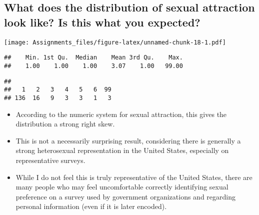 \documentclass[
]{article}
\newenvironment{Shaded}{\begin{snugshade}}{\end{snugshade}}
\newcommand{\FunctionTok}[1]{\textcolor[rgb]{0.00,0.00,0.00}{#1}}
\newcommand{\NormalTok}[1]{#1}
\newcommand{\SpecialCharTok}[1]{\textcolor[rgb]{0.00,0.00,0.00}{#1}}
\providecommand{\tightlist}{%
  \setlength{\itemsep}{0pt}\setlength{\parskip}{0pt}}
\begin{document}
\hypertarget{what-does-the-distribution-of-sexual-attraction-look-like-is-this-what-you-expected}{%
\subsection{What does the distribution of sexual attraction look like?
Is this what you
expected?}\label{what-does-the-distribution-of-sexual-attraction-look-like-is-this-what-you-expected}}

\begin{Shaded}
\end{Shaded}

\texttt{[image: Assignments\_files/figure-latex/unnamed-chunk-18-1.pdf]}

\begin{Shaded}
\end{Shaded}

\begin{verbatim}
##    Min. 1st Qu.  Median    Mean 3rd Qu.    Max. 
##    1.00    1.00    1.00    3.07    1.00   99.00
\end{verbatim}

\begin{Shaded}
\end{Shaded}

\begin{verbatim}
## 
##   1   2   3   4   5   6  99 
## 136  16   9   3   3   1   3
\end{verbatim}

\begin{itemize}
\tightlist
\item
  According to the numeric system for sexual attraction, this gives the
  distribution a strong right skew.
\item
  This is not a necessarily surprising result, considering there is
  generally a strong heterosexual representation in the United States,
  especially on representative surveys.
\item
  While I do not feel this is truly representative of the United States,
  there are many people who may feel uncomfortable correctly identifying
  sexual preference on a survey used by government organizations and
  regarding personal information (even if it is later encoded).
\end{itemize}
\end{document}
